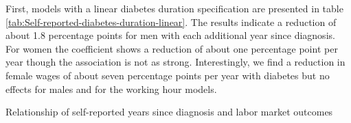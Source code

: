 \documentclass[12pt,english,british]{article}
\begin{document}
First, models with a linear diabetes duration specification are presented
in table \ref{tab:Self-reported-diabetes-duration-linear}. The results
indicate a reduction of about 1.8 percentage points for men with each
additional year since diagnosis. For women the coefficient shows a
reduction of about one percentage point per year though the association
is not as strong. Interestingly, we find a reduction in female wages of about seven percentage points per year with diabetes but no effects for males and for the working hour models.
\begin{table}[h]
\caption{\label{tab:Self-reported-diabetes-duration-linear}Relationship of self-reported years since diagnosis and labor market outcomes}
\begin{center}
\begin{adjustbox}{max width=\textwidth}


\end{adjustbox}
\end{center}
\end{table}
\end{document}
